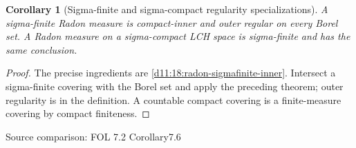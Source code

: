 \documentclass[11pt,oneside,openany]{book}
\newtheorem{corollary}[theorem]{Corollary}
\theoremstyle{definition}
\theoremstyle{remark}
\newcommand{\family}[1]{}
\newcommand{\source}[1]{\par\begingroup\small\sffamily\color{black!65}Source comparison: #1\par\endgroup}
\begin{document}
\begin{corollary}[Sigma-finite and sigma-compact regularity specializations]\family{D11.18.sigmafinite_radon_regular}\label{d11:18:sigmafinite-radon-regular}
A sigma-finite Radon measure is compact-inner and outer regular on every Borel set. A Radon measure on a sigma-compact LCH space is sigma-finite and has the same conclusion.
\end{corollary}
\begin{proof}
The precise ingredients are \cref{d11:18:radon-sigmafinite-inner}. Intersect a sigma-finite covering with the Borel set and apply the preceding theorem; outer regularity is in the definition. A countable compact covering is a finite-measure covering by compact finiteness.
\end{proof}
\source{FOL 7.2 Corollary7.6}
\end{document}

